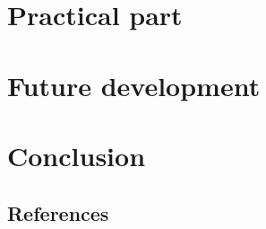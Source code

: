 \documentclass[a4paper,12pt]{report}
\begin{document}
\chapter{Practical part}

\chapter{Future development}

\chapter{Conclusion}


\section{References}




\end{document}
